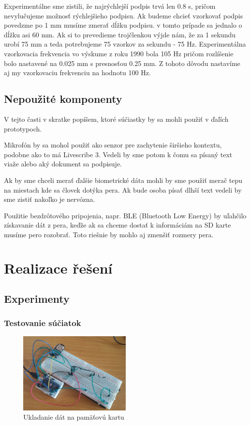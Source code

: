 Experimentálne sme zistili, že najrýchlejší podpis trvá len 0.8 s, pričom nevylučujeme možnosť rýchlejšieho podpisu. Ak budeme chcieť vzorkovať podpis povedzme po 1 mm musíme zmerať dĺžku podpisu. v tomto prípade sa jednalo o dĺžku asi 60 mm. Ak si to prevedieme trojčlenkou výjde nám, že za 1 sekundu urobí 75 mm a teda potrebujeme 75 vzorkov za sekundu - 75 Hz. Experimentálna vzorkovacia frekvencia vo výskume z roku 1990\cite{SchomakerL.1990Trbp} bola 105 Hz pričom rozlíšenie bolo nastavené na 0.025 mm s presnosťou 0.25 mm. Z tohoto dôvodu nastavíme aj my vzorkovaciu frekvenciu na hodnotu 100 Hz.

\section{Nepoužité komponenty}

V tejto časti v skratke popíšem, ktoré súčiastky by sa mohli použiť v ďaľích prototypoch.

Mikrofón by sa mohol použiť ako senzor pre zachytenie širšieho kontextu, podobne ako to má Livescribe 3. Vedeli by sme potom k čomu sa písaný text viaže alebo aký dokument sa podpisuje. 

Ak by sme chceli merať ďalšie biometrické dáta mohli by sme použiť merač tepu na miestach kde sa človek dotýka pera. Ak bude osoba písať dlhší text vedeli by sme zistiť nakoľko je nervózna. 

Použitie bezdrôtového pripojenia, napr. BLE (Bluetooth Low Energy) by uľahčilo získavanie dát z pera, keďže ak sa chceme dostať k informáciám na SD karte musíme pero rozobrať. Toto riešnie by mohlo aj zmenšiť rozmery pera.

\chapter{Realizace řešení}

\section{Experimenty}

\subsection*{Testovanie súčiatok}

\begin{figure}[hbt]
	\centering
	\includegraphics[width=0.5\textwidth]{obrazky-figures/FSRtestSD.png}
	\caption{Ukladanie dát na pamäťovú kartu}
	\label{Experiment1}
\end{figure}

